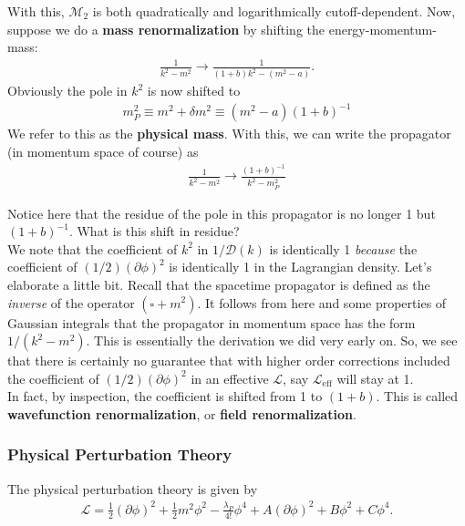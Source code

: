 \documentclass{book}
\theoremstyle{definition}
\newcommand{\p}{\partial}
\newcommand{\lag}{\mathcal{L}}
\newcommand{\f}[2]{\frac{#1}{#2}}
\newcommand{\D}{\mathcal{D}}
\begin{document}
With this, $\mathcal{M}_2$ is both quadratically and logarithmically cutoff-dependent. Now, suppose we do a \textbf{mass renormalization} by shifting the energy-momentum-mass:
\begin{align}
\f{1}{k^2 - m^2} \to \f{1}{(1+b)k^2 - (m^2 - a)}.
\end{align} 
Obviously the pole in $k^2$ is now shifted to 
\begin{align}
\boxed{m^2_P \equiv m^2 + \delta m^2 \equiv (m^2 - a)(1+b)^{-1}}
\end{align}
We refer to this as the \textbf{physical mass}. With this, we can write the propagator (in momentum space of course) as
\begin{align}
\boxed{\f{1}{k^2 - m^2} \to \f{(1+b)^{-1}}{k^2 - m^2_P}}
\end{align}


Notice here that the residue of the pole in this propagator is no longer 1 but $(1+b)^{-1}$. What is this shift in residue? \\

We note that the coefficient of $k^2$ in $1/\D(k)$ is identically 1 \textit{because} the coefficient of $(1/2)(\p \phi)^2$ is identically 1 in the Lagrangian density. Let's elaborate a little bit. Recall that the spacetime propagator is defined as the \textit{inverse} of the operator $(\square + m^2)$. It follows from here and some properties of Gaussian integrals that the propagator in momentum space has the form $1/(k^2 - m^2)$. This is essentially the derivation we did very early on. So, we see that there is certainly no guarantee that with higher order corrections included the coefficient of $(1/2)(\p \phi)^2$ in an effective $\lag$, say $\lag_{\text{eff}}$ will stay at 1. \\

In fact, by inspection, the coefficient is shifted from 1 to $(1+b)$. This is called \textbf{wavefunction renormalization}, or \textbf{field renormalization}. 






\subsubsection{Physical Perturbation Theory}

The physical perturbation theory is given by
\begin{align}
\boxed{ \lag = \f{1}{2}(\p \phi)^2 + \f{1}{2}m^2 \phi^2 - \f{\lambda_P}{4!}\phi^4 + A(\p \phi)^2 + B\phi^2 + C\phi^4.} 
\end{align}
\end{document}
